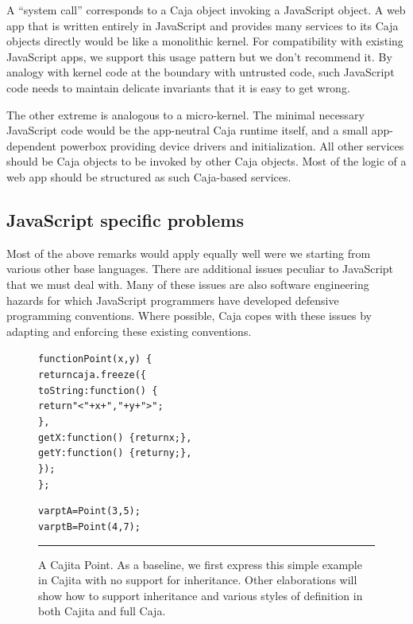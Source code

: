 \documentclass[letterpaper,twocolumn,10pt]{article}
\begin{document}
A ``system call'' corresponds to a Caja object invoking a JavaScript object. 
A web app that is written entirely in JavaScript and provides many services 
to its Caja objects directly would be like a monolithic kernel. For 
compatibility with existing JavaScript apps, we support this usage pattern 
but we don't recommend it. By analogy with kernel code at the boundary with 
untrusted code, such JavaScript code needs to maintain delicate invariants 
that it is easy to get wrong.

The other extreme is analogous to a micro-kernel. The minimal necessary 
JavaScript code would be the app-neutral Caja runtime itself, and a small 
app-dependent powerbox providing device drivers and initialization. All other 
services should be Caja objects to be invoked by other Caja objects. Most 
of the logic of a web app should be structured as such Caja-based services.

\subsection{JavaScript specific problems}

Most of the above remarks would apply equally well were we starting from 
various other base languages. There are additional issues peculiar to 
JavaScript that we must deal with. Many of these issues are also software 
engineering hazards for which JavaScript programmers have developed 
defensive programming conventions. Where possible, Caja copes with these 
issues by adapting and enforcing these existing conventions.

\begin{figure}[t!]
\begin{alltt}
function Point(x, y)\ \{
  return caja.freeze(\{
    toString: function()\ \{ 
      return "<" + x + "," + y + ">"; 
    \},
    getX: function()\ \{ return x; \},
    getY: function()\ \{ return y; \},
  \});
\};

var ptA = Point(3, 5);
var ptB = Point(4, 7);
\end{alltt}

\caption[A Cajita Point.]{A Cajita Point. As a baseline, we first express 
this simple example in Cajita with no support for inheritance. Other 
elaborations will show how to support inheritance and various styles of 
definition in both Cajita and full Caja. 
\\ } \hrule
\label{fig:cajita-point}
\end{figure}
\end{document}
